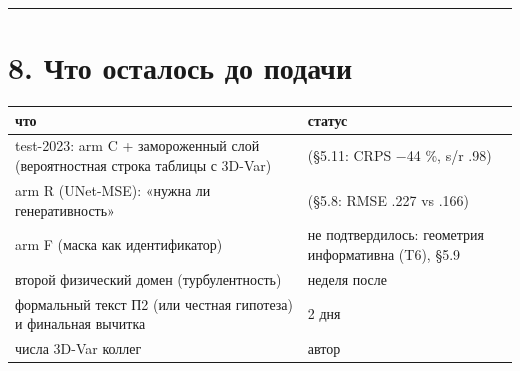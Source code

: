 \documentclass[11pt]{article}
\begin{document}
\bigskip\hrule\bigskip

\section*{8. Что осталось до подачи}

\begin{center}\footnotesize\begin{tabularx}{\textwidth}{lX}\toprule
что & статус \\ \midrule
test-2023: arm C + замороженный слой (вероятностная строка таблицы с 3D-Var) & {\symfont {\symfont ✓}} (§5.11: CRPS {\symfont −}44 \%, s/r .98) \\
arm R (UNet-MSE): «нужна ли генеративность» & {\symfont {\symfont ✓}} (§5.8: RMSE .227 vs .166) \\
arm F (маска как идентификатор) & {\symfont {\symfont ✓}} не подтвердилось: геометрия информативна (T6), §5.9 \\
второй физический домен (турбулентность) & неделя после \\
формальный текст П2 (или честная гипотеза) и финальная вычитка & 2 дня \\
числа 3D-Var коллег & автор \\
\bottomrule\end{tabularx}\end{center}
\end{document}
